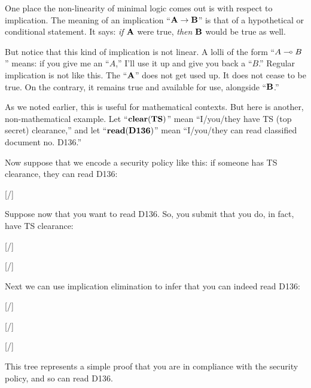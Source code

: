 \documentclass[../../../main.tex]{subfiles}
\begin{document}
One place the non-linearity of minimal logic comes out is with respect to implication. The meaning of an implication ``$\nd{A \impl/ B}$'' is that of a hypothetical or conditional statement. It says: \emph{if} $\mathbf{A}$ were true, \emph{then} $\mathbf{B}$ would be true as well.

But notice that this kind of implication is not linear. A lolli of the form ``$A \lolli/ B$'' means: if you give me an ``$A$,'' I'll use it up and give you back a ``$B$.'' Regular implication is not like this. The ``$\mathbf{A}$'' does not get used up. It does not cease to be true. On the contrary, it remains true and available for use, alongside ``$\mathbf{B}$.'' 

As we noted earlier, this is useful for mathematical contexts. But here is another, non-mathematical example. Let ``$\mathbf{clear(TS)}$'' mean ``I/you/they have TS (top secret) clearance,'' and let ``$\mathbf{read(D136)}$'' mean ``I/you/they can read classified document no. D136.'' 

Now suppose that we encode a security policy like this: if someone has TS clearance, they can read D136:

\begin{prooftree*}
  \hypo{}
  [\startrule/]{}
\end{prooftree*}

\noindent
Suppose now that you want to read D136. So, you submit that you do, in fact, have TS clearance:

\begin{prooftree*}
  \hypo{}
  [\startrule/]{}
  
  \hypo{}
  [\startrule/]{}
  
\end{prooftree*}

\noindent
Next we can use implication elimination to infer that you can indeed read D136:

\begin{prooftree*}
  \hypo{}
  [\startrule/]{}
  
  \hypo{}
  [\startrule/]{}
  
  [\implElim/]{}
\end{prooftree*}

\noindent
This tree represents a simple proof that you are in compliance with the security policy, and so can read D136.
\end{document}
